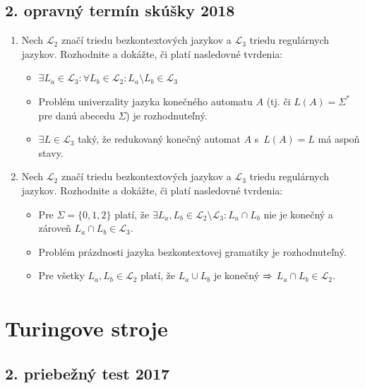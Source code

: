\documentclass[11pt,a4paper]{article}
\begin{document}
		\subsection{2. opravný termín skúšky 2018}
		
		\begin{enumerate}
			\item Nech $\mathcal{L}_{2}$ značí triedu bezkontextových jazykov a $\mathcal{L}_{3}$ triedu regulárnych jazykov. Rozhodnite a dokážte, či platí nasledovné tvrdenia:
			
			\begin{itemize}
				\item $\exists L_a \in \mathcal{L}_3: \forall L_b \in \mathcal{L}_2: L_a \setminus L_b \in \mathcal{L}_3$
				\item Problém univerzality jazyka konečného automatu $A$ (tj. či $L(A) = \Sigma^*$ pre danú abecedu $\Sigma$) je rozhodnuteľný.
				\item $\exists L \in \mathcal{L}_3$ taký, že redukovaný konečný automat $A$ s~$L(A) = L$ má aspoň  stavy.
			\end{itemize}
		
			\item Nech $\mathcal{L}_{2}$ značí triedu bezkontextových jazykov a $\mathcal{L}_{3}$ triedu regulárnych jazykov. Rozhodnite a dokážte, či platí nasledovné tvrdenia:
			
			\begin{itemize}
				\item Pre $\Sigma = \{0,1,2\}$ platí, že $\exists L_a, L_b \in \mathcal{L}_2 \setminus \mathcal{L}_3: L_a \cap L_b$ nie je konečný a zároveň $L_a \cap L_b \in \mathcal{L}_3$.
				\item Problém prázdnosti jazyka bezkontextovej gramatiky je rozhodnuteľný.
				\item Pre všetky $L_a, L_b \in \mathcal{L}_2$ platí, že $L_a \cup L_b$ je konečný $\xRightarrow{}$ $L_a \cap L_b \in \mathcal{L}_2$.
			\end{itemize}	
		\end{enumerate}

	\section{Turingove stroje}

		\subsection{2. priebežný test 2017}
\end{document}
